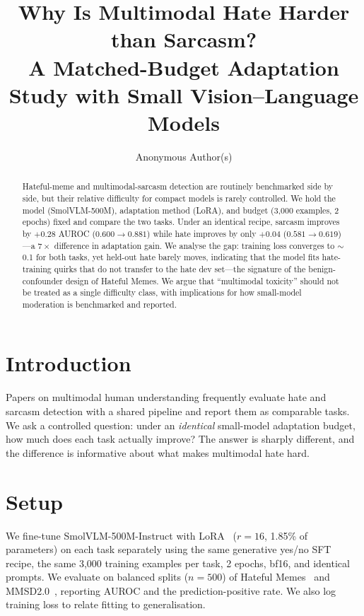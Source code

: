 \documentclass[sigconf,nonacm]{acmart}
\begin{document}
\title{Why Is Multimodal Hate Harder than Sarcasm?\\
A Matched-Budget Adaptation Study with Small Vision--Language Models}

\author{Anonymous Author(s)}

\begin{abstract}
Hateful-meme and multimodal-sarcasm detection are routinely benchmarked side by side, but
their relative difficulty for compact models is rarely controlled. We hold the model
(SmolVLM-500M), adaptation method (LoRA), and budget (3{,}000 examples, 2 epochs) fixed
and compare the two tasks. Under an identical recipe, sarcasm improves by $+0.28$ AUROC
($0.600\to0.881$) while hate improves by only $+0.04$ ($0.581\to0.619$)---a $7\times$
difference in adaptation gain. We analyse the gap: training loss converges to $\sim$0.1
for both tasks, yet held-out hate barely moves, indicating that the model fits
hate-training quirks that do not transfer to the hate dev set---the signature of the
benign-confounder design of Hateful Memes. We argue that ``multimodal toxicity'' should
not be treated as a single difficulty class, with implications for how small-model
moderation is benchmarked and reported.
\end{abstract}


\maketitle

\section{Introduction}
Papers on multimodal human understanding frequently evaluate hate and sarcasm detection
with a shared pipeline and report them as comparable tasks. We ask a controlled question:
under an \emph{identical} small-model adaptation budget, how much does each task actually
improve? The answer is sharply different, and the difference is informative about what
makes multimodal hate hard.

\section{Setup}
We fine-tune SmolVLM-500M-Instruct with LoRA~\cite{hu2022lora} ($r{=}16$, 1.85\% of
parameters) on each task separately using the same generative yes/no SFT recipe, the same
3{,}000 training examples per task, 2 epochs, bf16, and identical prompts. We evaluate on
balanced splits ($n{=}500$) of Hateful Memes~\cite{kiela2020hateful} and
MMSD2.0~\cite{qin2023mmsd2}, reporting AUROC and the prediction-positive rate. We also log
training loss to relate fitting to generalisation.
\end{document}
